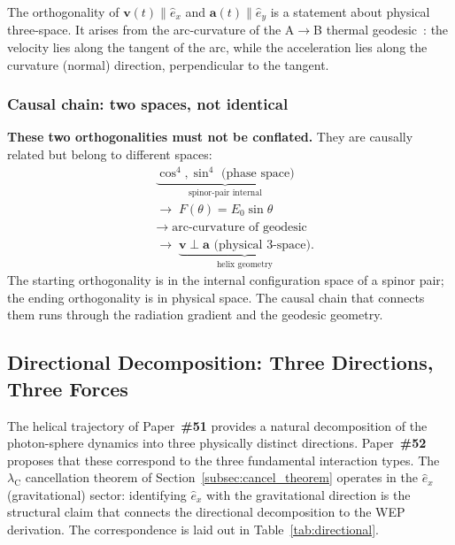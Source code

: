 \documentclass[12pt,letterpaper]{article}
\newcommand{\paperno}[1]{\textbf{\#{}#1}}
\newcommand{\lambdaC}{\lambda_{\mathrm{C}}}
\newcommand{\iphase}{\theta}
\newcommand{\ehat}[1]{\hat{e}_{#1}}
\begin{document}
The orthogonality of $\mathbf{v}(t)\parallel\ehat{x}$ and $\mathbf{a}(t)\parallel\ehat{y}$ is a statement about physical three-space. It arises from the arc-curvature of the A$\to$B thermal geodesic~\cite{hanamura49}: the velocity lies along the tangent of the arc, while the acceleration lies along the curvature (normal) direction, perpendicular to the tangent.

\subsubsection{Causal chain: two spaces, not identical}

\begin{mdframed}[style=orangebox]
\textbf{These two orthogonalities must not be conflated.} They are causally related but belong to different spaces:
\begin{equation}
\begin{aligned}
&\underbrace{\cos^4, \sin^4 \text{ (phase space)}}_{\text{spinor-pair internal}}
\\[4pt]
&\longrightarrow\;
F(\iphase) = E_0\sin\iphase
\\[4pt]
&\longrightarrow\;
\text{arc-curvature of geodesic}
\\[4pt]
&\longrightarrow\;
\underbrace{\mathbf{v}\perp\mathbf{a} \text{ (physical 3-space)}}_{\text{helix geometry}}.
\end{aligned}
\end{equation}
The starting orthogonality is in the internal configuration space of a spinor pair; the ending orthogonality is in physical space. The causal chain that connects them runs through the radiation gradient and the geodesic geometry.
\end{mdframed}

\subsection{Directional Decomposition: Three Directions, Three Forces}
\label{subsec:three_directions}

The helical trajectory of Paper~\paperno{51} provides a natural decomposition of the photon-sphere dynamics into three physically distinct directions. Paper~\paperno{52} proposes that these correspond to the three fundamental interaction types. The $\lambdaC$ cancellation theorem of Section~\ref{subsec:cancel_theorem} operates in the $\ehat{x}$ (gravitational) sector: identifying $\ehat{x}$ with the gravitational direction is the structural claim that connects the directional decomposition to the WEP derivation. The correspondence is laid out in Table~\ref{tab:directional}.
\end{document}
